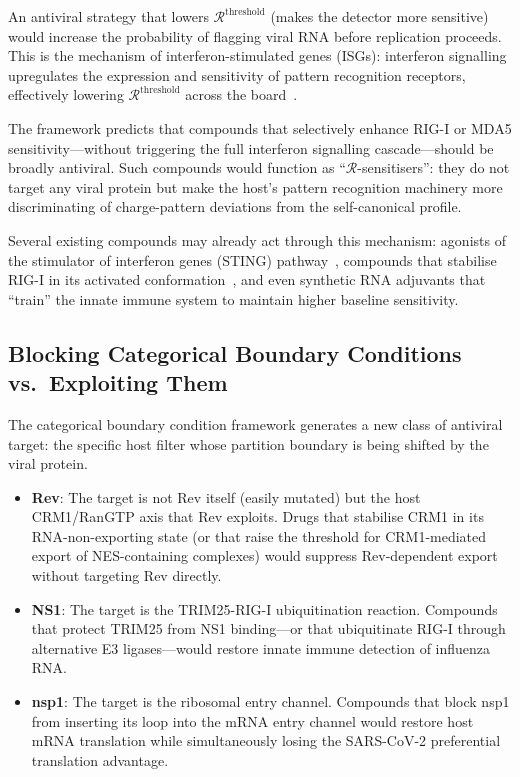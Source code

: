 \documentclass[12pt,a4paper]{article}
\theoremstyle{definition}
\theoremstyle{remark}
\newcommand{\Rcat}{\mathcal{R}}
\begin{document}
An antiviral strategy that lowers $\Rcat^{\mathrm{threshold}}$ (makes the detector more sensitive) would increase the probability of flagging viral RNA before replication proceeds. This is the mechanism of interferon-stimulated genes (ISGs): interferon signalling upregulates the expression and sensitivity of pattern recognition receptors, effectively lowering $\Rcat^{\mathrm{threshold}}$ across the board~\cite{Schneider2014}.

The framework predicts that compounds that selectively enhance RIG-I or MDA5 sensitivity---without triggering the full interferon signalling cascade---should be broadly antiviral. Such compounds would function as ``$\Rcat$-sensitisers'': they do not target any viral protein but make the host's pattern recognition machinery more discriminating of charge-pattern deviations from the self-canonical profile.

Several existing compounds may already act through this mechanism: agonists of the stimulator of interferon genes (STING) pathway~\cite{Ablasser2013}, compounds that stabilise RIG-I in its activated conformation~\cite{Choudhury2019}, and even synthetic RNA adjuvants that ``train'' the innate immune system to maintain higher baseline sensitivity.

\subsection{Blocking Categorical Boundary Conditions vs.\ Exploiting Them}

The categorical boundary condition framework generates a new class of antiviral target: the specific host filter whose partition boundary is being shifted by the viral protein.

\begin{itemize}
  \item \textbf{Rev}: The target is not Rev itself (easily mutated) but the host CRM1/RanGTP axis that Rev exploits. Drugs that stabilise CRM1 in its RNA-non-exporting state (or that raise the threshold for CRM1-mediated export of NES-containing complexes) would suppress Rev-dependent export without targeting Rev directly.
  \item \textbf{NS1}: The target is the TRIM25-RIG-I ubiquitination reaction. Compounds that protect TRIM25 from NS1 binding---or that ubiquitinate RIG-I through alternative E3 ligases---would restore innate immune detection of influenza RNA.
  \item \textbf{nsp1}: The target is the ribosomal entry channel. Compounds that block nsp1 from inserting its loop into the mRNA entry channel would restore host mRNA translation while simultaneously losing the SARS-CoV-2 preferential translation advantage.
\end{itemize}
\end{document}

